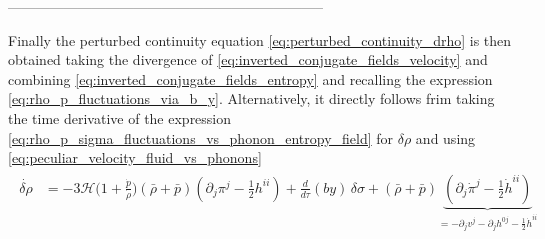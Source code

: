 {\color{blue}
--------------------------------------------------------------------

\noindent
Finally the perturbed continuity equation \eqref{eq:perturbed_continuity_drho} is then obtained taking the divergence of \eqref{eq:inverted_conjugate_fields_velocity} and combining \eqref{eq:inverted_conjugate_fields_entropy} and recalling the expression \eqref{eq:rho_p_fluctuations_via_b_y}.
Alternatively, it directly follows frim taking the time derivative of the expression \eqref{eq:rho_p_sigma_fluctuations_vs_phonon_entropy_field} for $\delta\rho$ and using \eqref{eq:peculiar_velocity_fluid_vs_phonons}
{\small\begin{align}\label{eq:continuity_eq_hamiltonian}
\begin{aligned}
    \dot{\delta\rho} &=-3\mathcal{H}\big(1+\tfrac{\dot{p}}{\dot{\rho}}\big)(\bar{\rho}+\bar{p})(\partial_j\pi^j-\tfrac12h^{ii})+\tfrac{d}{d\tau}(by)\,\delta\sigma +(\bar{\rho}+\bar{p})\underbrace{(\partial_j\dot{\pi}^j-\tfrac12\dot{h}^{ii})}_{=-\partial_jv^j-\partial_j h^{0j}-\tfrac12\dot{h}^{ii}}
\end{aligned}
\end{align}
}}

